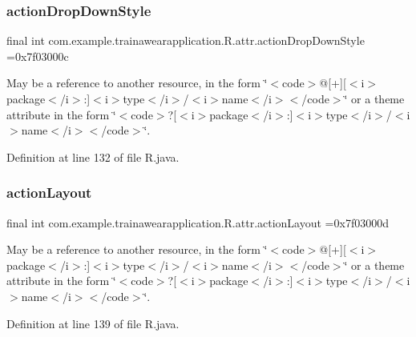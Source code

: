 \subsubsection{\texorpdfstring{actionDropDownStyle}{actionDropDownStyle}}
{\footnotesize\ttfamily final int com.\+example.\+trainawearapplication.\+R.\+attr.\+action\+Drop\+Down\+Style =0x7f03000c\hspace{0.3cm}{\ttfamily [static]}}

May be a reference to another resource, in the form \char`\"{}$<$code$>$@\mbox{[}+\mbox{]}\mbox{[}$<$i$>$package$<$/i$>$\+:\mbox{]}$<$i$>$type$<$/i$>$/$<$i$>$name$<$/i$>$$<$/code$>$\char`\"{} or a theme attribute in the form \char`\"{}$<$code$>$?\mbox{[}$<$i$>$package$<$/i$>$\+:\mbox{]}$<$i$>$type$<$/i$>$/$<$i$>$name$<$/i$>$$<$/code$>$\char`\"{}. 

Definition at line 132 of file R.\+java.

\mbox{\label{classcom_1_1example_1_1trainawearapplication_1_1_r_1_1attr_ab41e399403a37f11b1cfcacfa8125e5a}} 
\subsubsection{\texorpdfstring{actionLayout}{actionLayout}}
{\footnotesize\ttfamily final int com.\+example.\+trainawearapplication.\+R.\+attr.\+action\+Layout =0x7f03000d\hspace{0.3cm}{\ttfamily [static]}}

May be a reference to another resource, in the form \char`\"{}$<$code$>$@\mbox{[}+\mbox{]}\mbox{[}$<$i$>$package$<$/i$>$\+:\mbox{]}$<$i$>$type$<$/i$>$/$<$i$>$name$<$/i$>$$<$/code$>$\char`\"{} or a theme attribute in the form \char`\"{}$<$code$>$?\mbox{[}$<$i$>$package$<$/i$>$\+:\mbox{]}$<$i$>$type$<$/i$>$/$<$i$>$name$<$/i$>$$<$/code$>$\char`\"{}. 

Definition at line 139 of file R.\+java.

\mbox{\label{classcom_1_1example_1_1trainawearapplication_1_1_r_1_1attr_a31be65d06d85e0ead8dbb2159b74de07}} 
